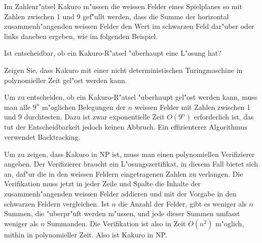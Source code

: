 Im Zahlenr"atsel Kakuro m"ussen die weissen Felder eines Spielplanes
so mit Zahlen zwischen 1 und 9 gef"ullt werden, dass die Summe der
horizontal zusammenh"angenden weissen Felder den Wert im
schwarzen Feld dar"uber oder links daneben ergeben, wie im folgenden
Beispiel. 
\begin{center}
\end{center}
\begin{teilaufgaben}
\item 
Ist entscheidbar, ob ein Kakuro-R"atsel "uberhaupt eine L"osung
hat?
\item
Zeigen Sie, dass Kakuro mit einer nicht deterministischen Turingmaschine
in polynomieller Zeit gel"ost werden kann.
\end{teilaufgaben}

\begin{loesung}
\begin{teilaufgaben}
\item
Um zu entscheiden, ob ein Kakuro-R"atsel "uberhaupt gel"ost werden
kann, muss man alle $9^n$ m"oglichen Belegungen der $n$ weissen
Felder mit Zahlen zwischen 1 und 9 durchtesten. Dazu ist zwar
exponentielle Zeit $O(9^n)$ erforderlich ist, das tut der Entscheidbarkeit
jedoch keinen Abbruch.
Ein effizienterer Algorithmus verwendet Backtracking.
\item
Um zu zeigen, dass Kakuro in NP ist, muss man einen polynomiellen
Verifizierer angeben. Der Verifizierer braucht ein L"osungszertifikat,
in diesem Fall bietet sich an, daf"ur die in den weissen Feldern eingetragenen
Zahlen zu verlangen. Die Verifikation muss jetzt in jeder Zeile und
Spalte die Inhalte der zusammenh"angenden weissen Felder addieren und 
mit der Vorgabe in den schwarzen Feldern vergleichen. Ist $n$ die Anzahl
der Felder, gibt es weniger als $n$ Summen, die "uberpr"uft werden m"ussen,
und jede dieser Summen umfasst weniger als $n$ Summanden. Die Verifikation
ist also in Zeit $O(n^2)$ m"oglich, mithin in polynomieller Zeit.
Also ist Kakuro in NP.
\end{teilaufgaben}
\end{loesung}
